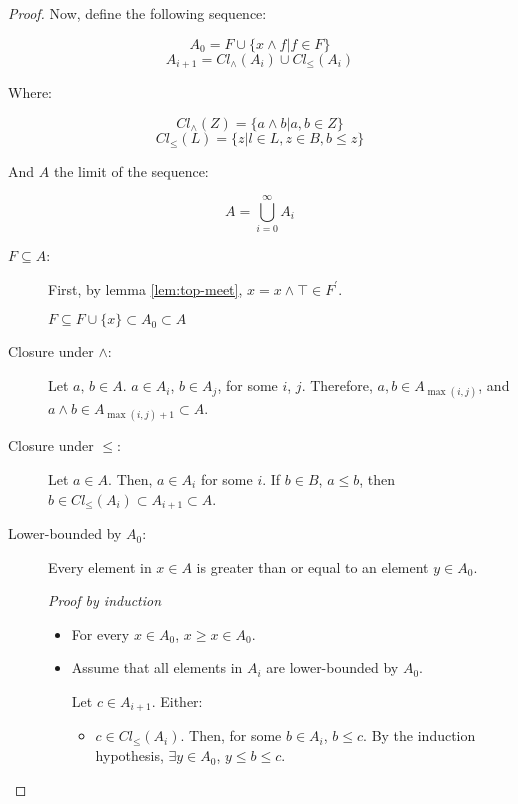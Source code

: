 \documentclass[notitlepage,a4paper]{article}
\begin{document}
\begin{enumerate}
\begin{proof}
           Now, define the following sequence:

           $$A_0 = F \cup \{ x ∧ f | f ∈ F \}$$
           $$A_{i+1} = Cl_{∧}(A_i) \cup Cl_{≤}(A_i)$$

           Where:

           $$Cl_{∧}(Z) = \{ a ∧ b  \vert a, b \in Z \}$$
           $$Cl_{≤}(L) = \{ z \vert l \in L, z \in B, b ≤ z \}$$

           And $A$ the limit of the sequence:

           $$A = \bigcup_{i=0}^{\infty} A_i$$

           \begin{description}
             \item[$F \subseteq A$:]

               First, by lemma \ref{lem:top-meet}, $x = x ∧ ⊤ ∈ F^\prime$.

               $F \subseteq F \cup \{x\} \subset A_0 \subset A$
               
             \item[Closure under $∧$:]

               Let $a,\,b \in A$. $a \in A_i$, $b \in A_j$, for some
               $i$, $j$. Therefore,
               $a,b \in A_{\max(i,j)}$, and $a ∧ b \in A_{\max(i,j)+1} \subset A$.

             \item[Closure under $≤$:]
               
               Let $a \in A$. Then, $a \in A_i$ for some $i$. If $b \in B$,
               $a ≤ b$, then $b ∈ Cl_{≤}(A_i) \subset A_{i+1} \subset A$.

             \item[Lower-bounded by $A_0$:]
               
               Every element in $x ∈ A$ is greater than or equal to an element
               $y ∈ A_0$.

               {\em Proof by induction}

               \begin{itemize}
                 \item For every $x \in A_0$, $x ≥ x \in A_0$. 
                 \item Assume that all elements in $A_i$ are lower-bounded
                   by $A_0$.

                   Let $c \in A_{i+1}$. Either:
                   
                   \begin{itemize}
                     \item $c \in Cl_{≤}(A_i)$. Then, for some $b \in A_i$,
                       $b ≤ c$. By the induction hypothesis, $\exists y \in A_0$,
                       $y ≤ b ≤ c$.


\end{itemize}
\end{itemize}
\end{description}
\end{proof}
\end{enumerate}
\end{document}
